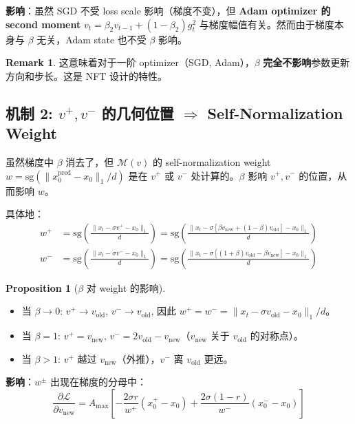 \documentclass[11pt,a4paper]{article}
\newcommand{\loss}{\mathcal{L}}
\newcommand{\sg}{\mathrm{sg}}
\theoremstyle{definition}
\newtheorem{remark}{Remark}
\newtheorem{proposition}{Proposition}
\begin{document}
\textbf{影响}：虽然 SGD 不受 loss scale 影响（梯度不变），但 \textbf{Adam optimizer 的 second moment} $v_t = \beta_2 v_{t-1} + (1-\beta_2) g_t^2$ 与梯度幅值有关。然而由于梯度本身与 $\beta$ 无关，Adam state 也不受 $\beta$ 影响。

\begin{remark}
这意味着对于一阶 optimizer（SGD, Adam），$\beta$ \textbf{完全不影响}参数更新方向和步长。这是 NFT 设计的特性。
\end{remark}

\subsection{机制 2: $v^+, v^-$ 的几何位置 $\Rightarrow$ Self-Normalization Weight}

虽然梯度中 $\beta$ 消去了，但 $\mathcal{M}(v)$ 的 self-normalization weight $w = \sg(\|x_0^{\text{pred}} - x_0\|_1/d)$ 是在 $v^+$ 或 $v^-$ 处计算的。$\beta$ 影响 $v^+, v^-$ 的位置，从而影响 $w$。

具体地：
\begin{align}
w^+ &= \sg\left(\frac{\|x_t - \sigma v^+ - x_0\|_1}{d}\right) = \sg\left(\frac{\|x_t - \sigma[\beta v_{\text{new}} + (1-\beta)v_{\text{old}}] - x_0\|_1}{d}\right) \\
w^- &= \sg\left(\frac{\|x_t - \sigma v^- - x_0\|_1}{d}\right) = \sg\left(\frac{\|x_t - \sigma[(1+\beta)v_{\text{old}} - \beta v_{\text{new}}] - x_0\|_1}{d}\right)
\end{align}

\begin{proposition}[$\beta$ 对 weight 的影响]
\leavevmode
\begin{itemize}
\item 当 $\beta \to 0$: $v^+ \to v_{\text{old}}$, $v^- \to v_{\text{old}}$, 因此 $w^+ = w^- = \|x_t - \sigma v_{\text{old}} - x_0\|_1/d$。
\item 当 $\beta = 1$: $v^+ = v_{\text{new}}$, $v^- = 2v_{\text{old}} - v_{\text{new}}$（$v_{\text{new}}$ 关于 $v_{\text{old}}$ 的对称点）。
\item 当 $\beta > 1$: $v^+$ 越过 $v_{\text{new}}$（外推），$v^-$ 离 $v_{\text{old}}$ 更远。
\end{itemize}
\end{proposition}

\textbf{影响}：$w^{\pm}$ 出现在梯度的分母中：
\begin{equation}
\frac{\partial\loss}{\partial v_{\text{new}}} = A_{\max}\left[-\frac{2\sigma r}{w^+}(x_0^+ - x_0) + \frac{2\sigma(1-r)}{w^-}(x_0^- - x_0)\right]
\end{equation}
\end{document}
